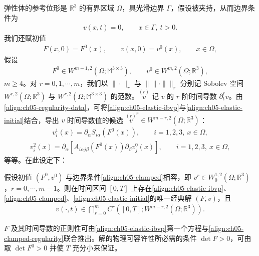 \documentclass[../../main.tex]{subfiles}
\begin{document}
弹性体的参考位形是 $\mathbb{R}^{3}$ 的有界区域 $\Omega$，具光滑边界 $\Gamma$，假设被夹持，从而边界条件为
\begin{align}
v(x,t)=0,\qquad x\in\Gamma,\ t>0.\label{align:ch05-clamped}
\end{align}
我们还赋初值
\begin{align}
F(x,0)=F^{0}(x),\qquad v(x,0)=v^{0}(x),\qquad x\in\Omega,\label{align:ch05-elastic-initial}
\end{align}
假设
\begin{align}
F^{0}\in W^{m-1,2}(\Omega;\mathbb{M}^{3\times3}),\qquad v^{0}\in W^{m,2}(\Omega;\mathbb{R}^{3}),\label{align:ch05-regularity-data}
\end{align}
$m\geqslant4$。对 $r=0,1,\cdots,m$，我们以 $\|\cdot\|_{r}$ 与 $\|\|\cdot\|\|_{r}$ 分别记 Sobolev 空间 $W^{r,2}(\Omega;\mathbb{R}^{3})$ 与 $W^{r,2}(\Omega;\mathbb{M}^{3\times3})$ 的范数。$\overset{(r)}{v}$ 记 $v$ 的 $r$ 阶时间导数 $\partial_{t}^{r}v$。由\eqref{align:ch05-regularity-data}，可将\eqref{align:ch05-elastic-ibvp}与\eqref{align:ch05-elastic-initial}结合，导出 $v$ 时间导数值的候选 $\overset{(r)}{v}^{r}\in W^{m-r,2}(\Omega;\mathbb{R}^{3})$：
\begin{align}
v_{i}^{1}(x)=\partial_{\alpha}S_{i\alpha}(F^{0}(x)),\qquad i=1,2,3,\ x\in\Omega,\label{align:ch05-v1}
\end{align}
\begin{align}
v_{i}^{2}(x)=\partial_{\alpha}[A_{i\alpha j\beta}(F^{0}(x))\partial_{\beta}v_{j}^{0}(x)],\qquad i=1,2,3,\ x\in\Omega,\label{align:ch05-v2}
\end{align}
等等。在此设定下：

\begin{theorem}\label{theorem:ch05-clamped-elastic}
假设初值 $(F^{0},v^{0})$ 与边界条件\eqref{align:ch05-clamped}相容，即 $v^{r}\in W_{0}^{1,2}(\Omega;\mathbb{R}^{3})$，$r=0,\cdots,m-1$。则在时间区间 $[0,T]$ 上存在\eqref{align:ch05-elastic-ibvp}、\eqref{align:ch05-clamped}、\eqref{align:ch05-elastic-initial}的唯一经典解 $(F,v)$，且
\begin{align}
v(\cdot,t)\in\bigcap_{r=0}^{m}C^{r}([0,T];W^{m-r,2}(\Omega;\mathbb{R}^{3})).\label{align:ch05-clamped-regularity}
\end{align}
\end{theorem}

$F$ 及其时间导数的正则性可由\eqref{align:ch05-elastic-ibvp}第一个方程与\eqref{align:ch05-clamped-regularity}联合推出。解的物理可容许性所必需的条件 $\det F>0$，可由取 $\det F^{0}>0$ 并使 $T$ 充分小来保证。
\end{document}
